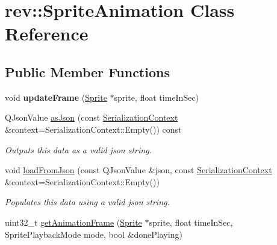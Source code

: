 \hypertarget{classrev_1_1_sprite_animation}{}\section{rev\+::Sprite\+Animation Class Reference}
\label{classrev_1_1_sprite_animation}
\subsection*{Public Member Functions}
\begin{DoxyCompactItemize}
\item 
\mbox{\label{classrev_1_1_sprite_animation_a1bd139bcf90a8fbf80d5ee5635215910}} 
void {\bfseries update\+Frame} (\mbox{\hyperlink{classrev_1_1_sprite}{Sprite}} $\ast$sprite, float time\+In\+Sec)
\item 
\mbox{\label{classrev_1_1_sprite_animation_aa4a91fd47b5fc91e99ac3ef924bc3e53}} 
Q\+Json\+Value \mbox{\hyperlink{classrev_1_1_sprite_animation_aa4a91fd47b5fc91e99ac3ef924bc3e53}{as\+Json}} (const \mbox{\hyperlink{structrev_1_1_serialization_context}{Serialization\+Context}} \&context=Serialization\+Context\+::\+Empty()) const
\begin{DoxyCompactList}\small\item\em Outputs this data as a valid json string. \end{DoxyCompactList}\item 
\mbox{\label{classrev_1_1_sprite_animation_acc55a2086ca5b1d0119ac7c17145577c}} 
void \mbox{\hyperlink{classrev_1_1_sprite_animation_acc55a2086ca5b1d0119ac7c17145577c}{load\+From\+Json}} (const Q\+Json\+Value \&json, const \mbox{\hyperlink{structrev_1_1_serialization_context}{Serialization\+Context}} \&context=Serialization\+Context\+::\+Empty())
\begin{DoxyCompactList}\small\item\em Populates this data using a valid json string. \end{DoxyCompactList}\item 
\mbox{\label{classrev_1_1_sprite_animation_abc4698d31aeb806ed7b7e297afa00cbe}} 
uint32\+\_\+t \mbox{\hyperlink{classrev_1_1_sprite_animation_abc4698d31aeb806ed7b7e297afa00cbe}{get\+Animation\+Frame}} (\mbox{\hyperlink{classrev_1_1_sprite}{Sprite}} $\ast$sprite, float time\+In\+Sec, Sprite\+Playback\+Mode mode, bool \&done\+Playing)

\end{DoxyCompactItemize}
